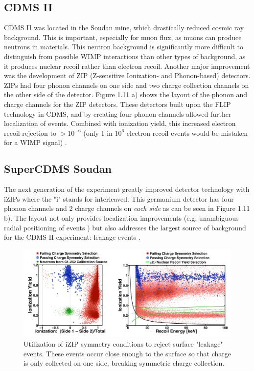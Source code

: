 \documentclass{report}
\begin{document}
\subsection{CDMS II}

CDMS II was located in the Soudan mine, which drastically reduced cosmic ray background. This is important, especially for muon flux, as muons can produce neutrons in materials. This neutron background is significantly more difficult to distinguish from possible WIMP interactions than other types of background, as it produces nuclear recoil rather than electron recoil. Another major improvement was the development of ZIP (Z-sensitive Ionization- and Phonon-based) detectors. ZIPs had four phonon channels on one side and two charge collection channels on the other side of the detector. Figure 1.11 a) shows the layout of the phonon and charge channels for the ZIP detectors. These detectors built upon the FLIP technology in CDMS, and by creating four phonon channels allowed further localization of events. Combined with ionization yield, this increased electron recoil rejection to $> 10^{-6}$ (only 1 in $10^6$ electron recoil events would be mistaken for a WIMP signal) \cite{Saab2012}.

\subsection{SuperCDMS Soudan}

The next generation of the experiment greatly improved detector technology with iZIPs where the "i" stands for interleaved. This germanium detector has four phonon channels and 2 charge channels on \emph{each side} as can be seen in Figure 1.11 b). The layout not only provides localization improvements (e.g. unambiguous radial positioning of events \cite{DOE}) but also addresses the largest source of background for the CDMS II experiment: leakage events \cite{Akerib2005}.

\begin{figure}[h]
\centering
\includegraphics[width = .8\textwidth]{iZIP_ionization.png}
\caption{Utilization of iZIP symmetry conditions to reject surface "leakage" events. These events occur close enough to the surface so that charge is only collected on one side, breaking symmetric charge collection.}
\end{figure}
\end{document}
